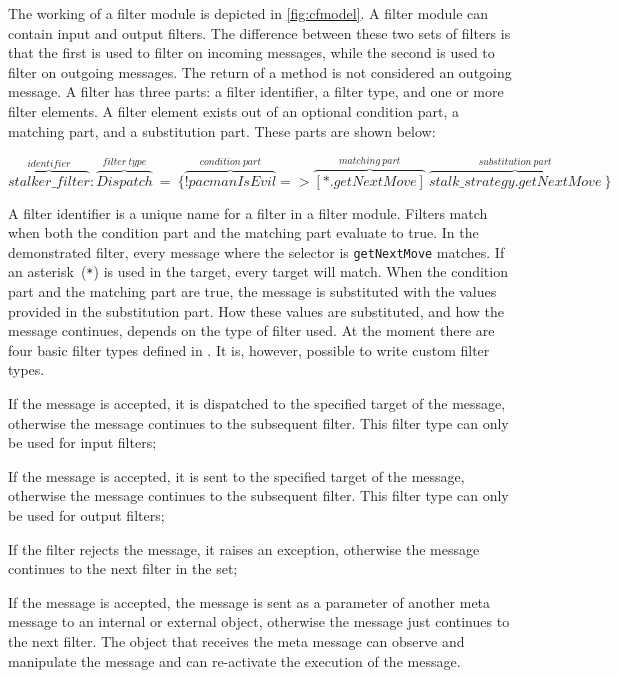 The working of a filter module is depicted in \autoref{fig:cfmodel}.
A filter module can contain input and output filters.
The difference between these two sets of filters is that the first is used to filter on incoming messages, while the second is used to filter on outgoing messages.
The return of a method is not considered an outgoing message.
A filter has three parts: a filter identifier, a filter type, and one or more filter elements.
A filter element exists out of an optional condition part, a matching part, and a substitution part.
These parts are shown below:
\begin{center}
$\overbrace{stalker\_filter}^{identifier}:\overbrace{Dispatch}^{filter~type}~=~\{\overbrace{!pacmanIsEvil}^{condition~part}
=>\overbrace{[*.getNextMove]}^{matching~part}~\overbrace{stalk\_strategy.getNextMove}^{substitution~part}~\}$
\end{center}
A filter identifier is a unique name for a filter in a filter module. 
Filters match when both the condition part and the matching part evaluate to true.
In the demonstrated filter, every message where the selector is \lstinline|getNextMove| matches.
If an asterisk~(\lstinline|*|) is used in the target, every target will match.
When the condition part and the matching part are true, the message is substituted with the values provided in the substitution part.
How these values are substituted, and how the message continues, depends on the type of filter used.
At the moment there are four basic filter types defined in \Compose*.
It is, however, possible to write custom filter types.

\begin{description}[style=sameline,leftmargin=18mm]
  \item[Dispatch] If the message is accepted, it is dispatched to the specified target of the message, otherwise the message continues to the subsequent filter.
    This filter type can only be used for input filters;
  \item[Send] If the message is accepted, it is sent to the specified target of the message, otherwise the message continues to the subsequent filter.
    This filter type can only be used for output filters;
  \item[Error] If the filter rejects the message, it raises an exception, otherwise the message continues to the next filter in the set;
  \item[Meta] If the message is accepted, the message is sent as a parameter of another meta message to an internal or external object, otherwise the message just continues to the next filter.
    The object that receives the meta message can observe and manipulate the message and can re-activate the execution of the message.
\end{description}

